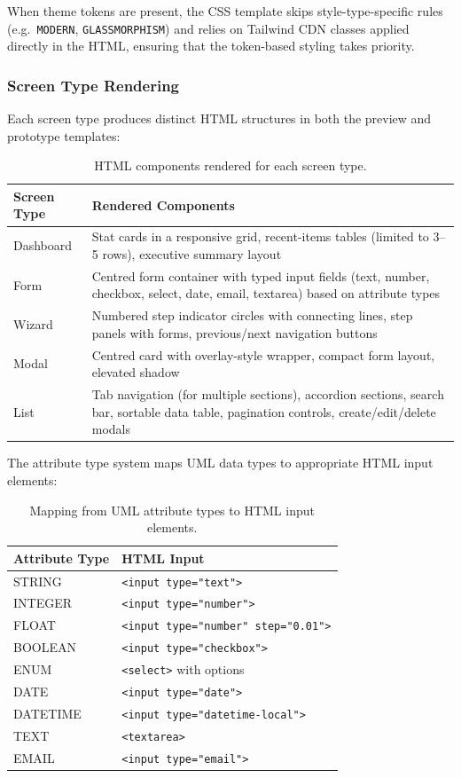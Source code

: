 When theme tokens are present, the CSS template skips style-type-specific rules (e.g.\ \texttt{MODERN}, \texttt{GLASSMORPHISM}) and relies on Tailwind CDN classes applied directly in the HTML, ensuring that the token-based styling takes priority.


\subsubsection{Screen Type Rendering}

Each screen type produces distinct HTML structures in both the preview and prototype templates:

\begin{table}[H]
\centering
\small
\begin{tabular}{lp{9cm}}
\hline
\textbf{Screen Type} & \textbf{Rendered Components} \\
\hline
Dashboard & Stat cards in a responsive grid, recent-items tables (limited to 3--5 rows), executive summary layout \\
Form & Centred form container with typed input fields (text, number, checkbox, select, date, email, textarea) based on attribute types \\
Wizard & Numbered step indicator circles with connecting lines, step panels with forms, previous/next navigation buttons \\
Modal & Centred card with overlay-style wrapper, compact form layout, elevated shadow \\
List & Tab navigation (for multiple sections), accordion sections, search bar, sortable data table, pagination controls, create/edit/delete modals \\
\hline
\end{tabular}
\caption{HTML components rendered for each screen type.}
\label{tab:screen_types}
\end{table}

The attribute type system maps UML data types to appropriate HTML input elements:

\begin{table}[H]
\centering
\begin{tabular}{ll}
\hline
\textbf{Attribute Type} & \textbf{HTML Input} \\
\hline
STRING & \texttt{<input type="text">} \\
INTEGER & \texttt{<input type="number">} \\
FLOAT & \texttt{<input type="number" step="0.01">} \\
BOOLEAN & \texttt{<input type="checkbox">} \\
ENUM & \texttt{<select>} with options \\
DATE & \texttt{<input type="date">} \\
DATETIME & \texttt{<input type="datetime-local">} \\
TEXT & \texttt{<textarea>} \\
EMAIL & \texttt{<input type="email">} \\
\hline
\end{tabular}
\caption{Mapping from UML attribute types to HTML input elements.}
\label{tab:attr_types}
\end{table}


